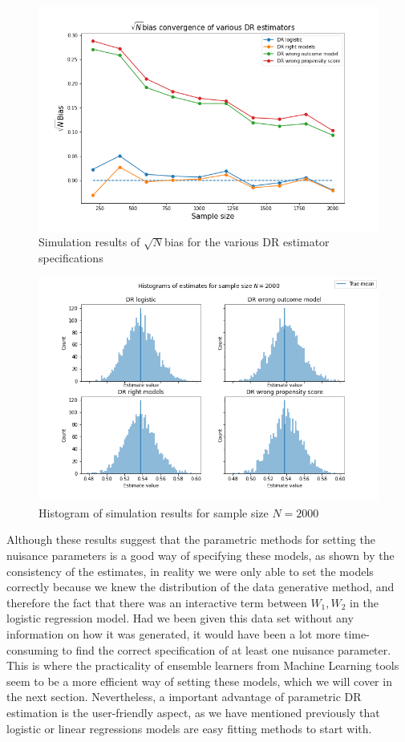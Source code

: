 \documentclass[12pt,twoside]{article}
\begin{document}
\begin{figure}[h!]
    \centering
    \includegraphics[width = 0.8\columnwidth]{figures/sqrtnpara.png}
    \caption{Simulation results of $\sqrt{N}$bias for the various DR estimator specifications}
    \label{figsqrtnpara}
\end{figure}
\begin{figure}[h!]
    \centering
    \includegraphics[width = 0.8\columnwidth]{figures/histpara.png}
    \caption{Histogram of simulation results for  sample size $N = 2000$}
    \label{fighistpara}
\end{figure}

Although these results suggest that the parametric methods for setting the nuisance parameters is a good way of specifying these models, as shown by the consistency of the estimates, in reality we were only able to set the models correctly because we knew the distribution of the data generative method, and therefore the fact that there was an interactive term between $W_1,W_2$ in the logistic regression model. Had we been given this data set without any information on how it was generated, it would have been a lot more time-consuming to find the correct specification of at least one nuisance parameter. This is where the practicality of ensemble learners from Machine Learning tools seem to be a more efficient way of setting these models, which we will cover in the next section. Nevertheless, a important advantage of parametric DR estimation is the user-friendly aspect, as we have mentioned previously that logistic or linear regressions models are easy fitting methods to start with.
\end{document}
